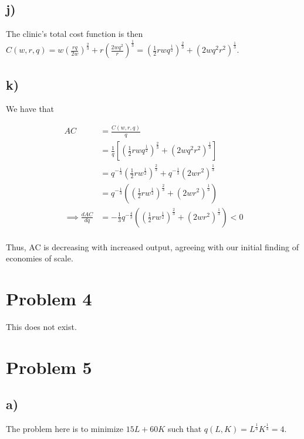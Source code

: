 \documentclass[12pt,letterpaper]{article}
\theoremstyle{definition}
\begin{document}
\subsection*{j)}

The clinic's total cost function is then $C(w,r,q) =
w(\frac{rq}{2w})^{\frac{2}{3}} + r(\frac{2wq^2}{r})^{\frac{1}{3}} =
(\frac{1}{2}rwq^{\frac{1}{2}})^{\frac{2}{3}} + (2wq^2r^2)^{\frac{1}{3}}$.

\subsection*{k)}

We have that

\begin{align*}
  AC &= \frac{C(w,r,q)}{q} \\
     &= \frac{1}{q} [(\frac{1}{2}rwq^{\frac{1}{2}})^{\frac{2}{3}} + (2wq^2r^2)^{\frac{1}{3}}] \\
     &= q^{-\frac{1}{3}}(\frac{1}{2}rw^{\frac{1}{2}})^{\frac{2}{3}} + q^{-\frac{1}{3}}(2wr^2)^{\frac{1}{3}} \\
     &= q^{-\frac{1}{3}}((\frac{1}{2}rw^{\frac{1}{2}})^{\frac{2}{3}} + (2wr^2)^{\frac{1}{3}}) \\
  \implies \frac{dAC}{dq} &= -\frac{1}{3}q^{-\frac{4}{3}}((\frac{1}{2}rw^{\frac{1}{2}})^{\frac{2}{3}} + (2wr^2)^{\frac{1}{3}}) < 0\\
\end{align*}

Thus, AC is decreasing with increased output, agreeing with our initial finding
of economies of scale.

\section*{Problem 4}

This does not exist.

\section*{Problem 5}

\subsection*{a)}

The problem here is to minimize $15L + 60K$ such that $q(L,K) =
L^{\frac{1}{3}}K^{\frac{1}{3}} = 4$.
\end{document}
